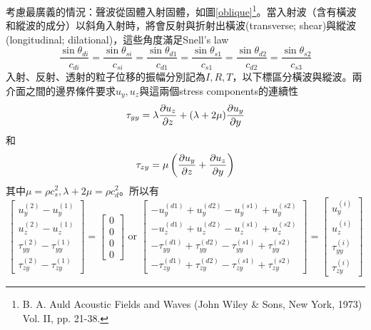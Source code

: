 \documentclass[12pt]{report}
\begin{document}
考慮最廣義的情況：聲波從固體入射固體，如圖\ref{oblique}\footnote{B. A.
Auld Acoustic Fields and Waves (John Wiley \& Sons, New York, 1973) Vol. II, pp. 21-38.}。當入射波（含有橫波和縱波的成分）以斜角入射時，將會反射與折射出橫波(transverse; shear)與縱波(longitudinal; dilational)，這些角度滿足Snell's law
\begin{equation}
    \frac{\sin\theta_{di}}{c_{di}}
    =\frac{\sin\theta_{si}}{c_{si}}
    =\frac{\sin\theta_{d1}}{c_{d1}}
    =\frac{\sin\theta_{s1}}{c_{s1}}
    =\frac{\sin\theta_{d2}}{c_{d2}}
    =\frac{\sin\theta_{s2}}{c_{s3}}
\end{equation}
入射、反射、透射的粒子位移的振幅分別記為$I,R,T$，以下標區分橫波與縱波。兩介面之間的邊界條件要求$u_y, u_z$與這兩個stress components的連續性
\begin{equation}
    \tau_{yy}=\lambda\pdv{u_z}{z}+(\lambda+2\mu)\pdv{u_y}{y}
\end{equation}
和
\begin{equation}
    \tau_{zy}=\mu\left(\pdv{u_y}{z}+\pdv{u_z}{y}\right)
\end{equation}
其中$\mu=\rho c_{s}^2, \lambda+2\mu=\rho c_{d}^2$。所以有
\begin{equation}
    \left[\begin{array}{l}
        u_y^{(2)}-u_y^{(1)} \\
        u_z^{(2)}-u_z^{(1)} \\
        \tau_{y y}^{(2)}-\tau_{y y}^{(1)} \\
        \tau_{z y}^{(2)}-\tau_{z y}^{(1)}
        \end{array}\right]=\left[\begin{array}{l}
        0 \\
        0 \\
        0 \\
        0
        \end{array}\right] \text { or }\left[\begin{array}{l}
        -u_y^{(d 1)}+u_y^{(d 2)}-u_y^{(s 1)}+u_y^{(s 2)} \\
        -u_z^{(d 1)}+u_z^{(d 2)}-u_z^{(s 1)}+u_z^{(s 2)} \\
        -\tau_{y y}^{(d 1)}+\tau_{y y}^{(d 2)}-\tau_{y y}^{(s 1)}+\tau_{y y}^{(s 2)} \\
        -\tau_{z y}^{(d 1)}+\tau_{z y}^{(d 2)}-\tau_{z y}^{(s 1)}+\tau_{z y}^{(s 2)}
        \end{array}\right]=\left[\begin{array}{c}
        u_y^{(i)} \\
        u_z^{(i)} \\
        \tau_{y y}^{(i)} \\
        \tau_{z y}^{(i)}
        \end{array}\right]
\end{equation}
\end{document}
